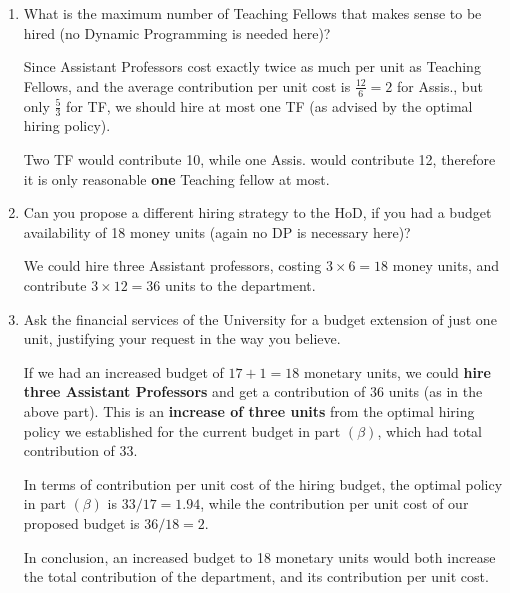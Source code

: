 \begin{prob}
\begin{enumerate}[label = {\textbf{(\greek*)}}]
\begin{sol}
    
    \end{sol}
    \item What is the maximum number of Teaching Fellows that makes sense to be hired (no Dynamic Programming is needed here)?
    
    \begin{sol}
    Since Assistant Professors cost exactly twice as much per unit as Teaching Fellows, and the average contribution per unit cost is $\frac{12}6=2$ for Assis., but only $\frac53$ for TF, we should hire at most one TF (as advised by the optimal hiring policy). 
    
    Two TF would contribute 10, while one Assis. would contribute 12, therefore it is only reasonable \textbf{one} Teaching fellow at most.
    \end{sol}
    \item Can you propose a different hiring strategy to the HoD, if you had a budget availability of 18 money units (again no DP is necessary here)?
    
    \begin{sol}
    We could hire three Assistant professors, costing $3\times6=18$ money units, and contribute $3\times 12=36$ units to the department.
    \end{sol}
    \item Ask the financial services of the University for a budget extension of just one unit, justifying your request in the way you believe.
    
    \begin{sol}
    If we had an increased budget of $17+1=18$ monetary units, we could \textbf{hire three Assistant Professors} and get a contribution of $36$ units (as in the above part).
    This is an \textbf{increase of three units} from the optimal hiring policy we established for the current budget in part $(\beta)$, which had total contribution of $33$.
    
    In terms of contribution per unit cost of the hiring budget, the optimal policy in part $(\beta)$ is $33/17=1.94$, while the contribution per unit cost of our proposed budget is $36/18=2$. 
    
    In conclusion, an increased budget to 18 monetary units would both increase the total contribution of the department, and its contribution per unit cost.
    \end{sol}
\end{enumerate}
\end{prob}

\pagebreak

